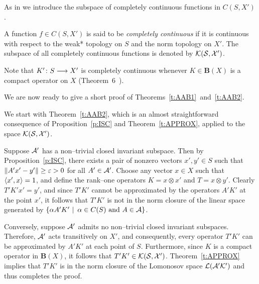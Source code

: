 \medskip

As in \cite{AAB95} we introduce the subspace of completely
continuous functions in $C(S,X')$.

\begin{defn}
A function $f\in C(S,X')$ is said to be {\em completely
continuous} if it is continuous with respect to the weak*
topology on $S$ and the norm topology on $X'$. The subspace of
all completely continuous functions is denoted by $\cal
K(S,X')$.
\end{defn}

Note that $K'\colon S \longrightarrow X'$ is completely continuous whenever
$K\in\mathbf{B}(X)$ is a compact operator on $X$
(Theorem~6~\cite[p.\,486]{DS57}).

\medskip

We are now ready to give a short proof of
Theorems~\ref{t:AAB1}~and~\ref{t:AAB2}.

\medskip
\goodbreak


\bigskip

We start with Theorem~\ref{t:AAB2}, which is an almost
straightforward consequence of Proposition~\ref{p:ISC} and
Theorem~\ref{t:APPROX}, applied to the space $\cal K(S,X')$.

\medskip

Suppose ${\cal A}'$ has a non--trivial closed  invariant subspace.
Then by Proposition~\ref{p:ISC}, there exists a pair of nonzero
vectors $x',y' \in S$ such that $\left\Vert A'x' - y'\right\Vert \geq \varepsilon >
0$ for all $A'\in{\cal A}'$. Choose any vector $x \in X$ such that
$\left<x',x\right>=1$, and define the rank--one operators $K=x\otimes
x'$ and $T=x\otimes y'$. Clearly $T'K'x' = y'$, and since
$T'K'$ cannot be approximated by the operators $A'K'$ at the
point $x'$, it follows that $T'K'$ is not in the norm closure
of the linear space generated by $\left\{ \alpha A' K'\,\,|\,\,\,
\alpha \in C(S) \text{ and } A \in {\cal A}\right\}$.

\smallskip

Conversely, suppose ${\cal A}'$ admits no non--trivial closed
invariant subspaces. Therefore, ${\cal A}'$ acts transitively on
$X'$, and consequently, every operator $T'K'$ can be
approximated by $A'K'$ at each point of $S$. Furthermore, since
$K$ is a compact operator in $\mathbf{B}(X)$, it follows that
$T'K' \in \cal K(S,X')$. Theorem~\ref{t:APPROX} implies that
$T'K'$ is in the norm closure of the Lomonosov space
$\cal{L}({\cal A}'K')$ and thus completes the proof.


